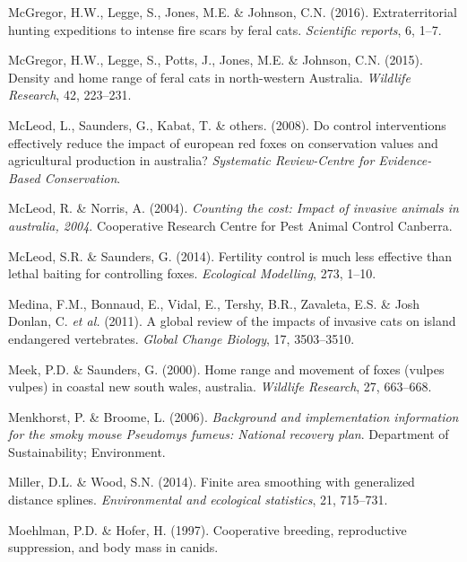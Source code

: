 \documentclass[11pt,a4paper,titlepage,twoside,openright]{style/unimelbthesis}
\begin{document}
\begin{mainmatter}
\leavevmode\hypertarget{ref-mcgregor2016extraterritorial}{}%
McGregor, H.W., Legge, S., Jones, M.E. \& Johnson, C.N. (2016). Extraterritorial hunting expeditions to intense fire scars by feral cats. \emph{Scientific reports}, 6, 1--7.

\leavevmode\hypertarget{ref-mcgregor2015density}{}%
McGregor, H.W., Legge, S., Potts, J., Jones, M.E. \& Johnson, C.N. (2015). Density and home range of feral cats in north-western Australia. \emph{Wildlife Research}, 42, 223--231.

\leavevmode\hypertarget{ref-mcleod2008control}{}%
McLeod, L., Saunders, G., Kabat, T. \& others. (2008). Do control interventions effectively reduce the impact of european red foxes on conservation values and agricultural production in australia? \emph{Systematic Review-Centre for Evidence-Based Conservation}.

\leavevmode\hypertarget{ref-mcleod2004counting}{}%
McLeod, R. \& Norris, A. (2004). \emph{Counting the cost: Impact of invasive animals in australia, 2004}. Cooperative Research Centre for Pest Animal Control Canberra.

\leavevmode\hypertarget{ref-mcleod2014fertility}{}%
McLeod, S.R. \& Saunders, G. (2014). Fertility control is much less effective than lethal baiting for controlling foxes. \emph{Ecological Modelling}, 273, 1--10.

\leavevmode\hypertarget{ref-medina2011global}{}%
Medina, F.M., Bonnaud, E., Vidal, E., Tershy, B.R., Zavaleta, E.S. \& Josh Donlan, C. \emph{et al.} (2011). A global review of the impacts of invasive cats on island endangered vertebrates. \emph{Global Change Biology}, 17, 3503--3510.

\leavevmode\hypertarget{ref-meek2000home}{}%
Meek, P.D. \& Saunders, G. (2000). Home range and movement of foxes (vulpes vulpes) in coastal new south wales, australia. \emph{Wildlife Research}, 27, 663--668.

\leavevmode\hypertarget{ref-menkhorst2006background}{}%
Menkhorst, P. \& Broome, L. (2006). \emph{Background and implementation information for the smoky mouse Pseudomys fumeus: National recovery plan}. Department of Sustainability; Environment.

\leavevmode\hypertarget{ref-miller2014finite}{}%
Miller, D.L. \& Wood, S.N. (2014). Finite area smoothing with generalized distance splines. \emph{Environmental and ecological statistics}, 21, 715--731.

\leavevmode\hypertarget{ref-moehlman1997cooperative}{}%
Moehlman, P.D. \& Hofer, H. (1997). Cooperative breeding, reproductive suppression, and body mass in canids.


\end{mainmatter}
\end{document}
